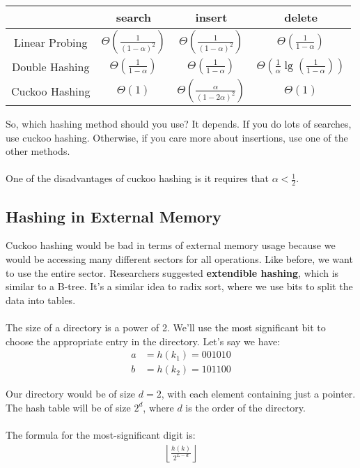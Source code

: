 \documentclass[]{article}
\theoremstyle{definition}
\begin{document}
			\begin{center}
				\begin{tabular}{|c|c|c|c|}
					\hline
					& search & insert & delete \\ \hline
					Linear Probing & $\Theta \left( \frac{1}{(1 - \alpha)^2} \right)$ & $\Theta \left( \frac{1}{(1 - \alpha)^2} \right)$ & $\Theta \left( \frac{1}{1 - \alpha} \right)$ \\ \hline
					Double Hashing & $\Theta \left( \frac{1}{1 - \alpha} \right)$ & $\Theta \left( \frac{1}{1 - \alpha} \right)$ & $\Theta \left( \frac{1}{\alpha} \lg \left( \frac{1}{1 - \alpha} \right) \right)$ \\ \hline
					Cuckoo Hashing & $\Theta \left( 1 \right)$ & $\Theta \left( \frac{\alpha}{(1 - 2 \alpha)^2} \right)$ & $\Theta \left( 1 \right)$ \\ \hline
				\end{tabular}
			\end{center}

			So, which hashing method should you use? It depends. If you do lots of searches, use cuckoo hashing. Otherwise, if you care more about insertions, use one of the other methods.
			\\ \\
			One of the disadvantages of cuckoo hashing is it requires that $\alpha < \frac{1}{2}$.

		\subsection{Hashing in External Memory}
			Cuckoo hashing would be bad in terms of external memory usage because we would be accessing many different sectors for all operations. Like before, we want to use the entire sector. Researchers suggested \textbf{extendible hashing}, which is similar to a B-tree. It's a similar idea to radix sort, where we use bits to split the data into tables.
			\\ \\
			The size of a directory is a power of 2. We'll use the most significant bit to choose the appropriate entry in the directory. Let's say we have:
			\begin{align*}
				a &= h(k_1) = 001010 \\
				b &= h(k_2) = 101100
			\end{align*}

			Our directory would be of size $d = 2$, with each element containing just a pointer. The hash table will be of size $2^d$, where $d$ is the order of the directory.
			\\ \\
			The formula for the most-significant digit is:
			\begin{align*}
				\left \lfloor \frac{h(k)}{2^{L - d}} \right \rfloor
			\end{align*}
\end{document}
